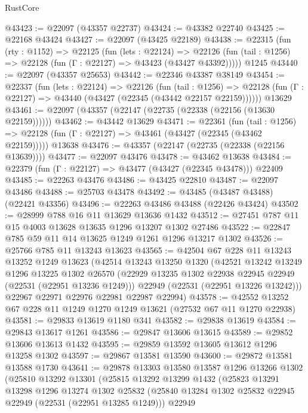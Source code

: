 \begin{lexlean}{RustCore}
\begin{coremodule}
@43423 := @22097 (@43357 @22737)
@43424 := @43382 @22740
@43425 := @22168 @43424
@43427 := @22097 (@43425 @22189)
@43438 := @22315
    (fun (rty : @1152) =>
    @22125
      (fun (lets : @22124) =>
      @22126 (fun (tail : @1256) => @22128 (fun (Γ : @22127) => @43423 (@43427 @43392)))))
    @1245
@43440 := @22097 (@43357 @25653)
@43442 := @22346 @43387 @38149
@43454 := @22337
    (fun (lets : @22124) =>
    @22126
      (fun (tail : @1256) =>
      @22128 (fun (Γ : @22127) => @43440 (@43427 (@22345 (@43442 @22157 @22159))))))
    @13629
@43461 := @22097 (@43357 (@22147 (@22735 (@22338 (@22156 (@13630 @22159))))))
@43462 := @43442 @13629
@43471 := @22361
    (fun (tail : @1256) => @22128 (fun (Γ : @22127) => @43461 (@43427 (@22345 (@43462 @22159)))))
    @13638
@43476 := @43357 (@22147 (@22735 (@22338 (@22156 @13639))))
@43477 := @22097 @43476
@43478 := @43462 @13638
@43484 := @22379 (fun (Γ : @22127) => @43477 (@43427 (@22345 @43478))) @22409
@43485 := @22263 @43476
@43486 := @43425 @22810
@43487 := @22097 @43486
@43488 := @25703 @43478
@43492 := @43485 (@43487 @43488) (@22421 @43356)
@43496 := @22263 @43486 @43488 (@22426 @43424)
@43502 := @28999 @788 @16 @11 @13629 @13636 @1432
@43512 := @27451 @787 @11 @15 @4003 @13628 @13635 @1296 @13207 @1302 @27486
@43522 := @22847 @785 @59 @11 @14 @13625 @1249 @1261 @1296 @13217 @1302
@43526 := @25766 @785 @11 @13243 @13623
@43565 := @42504
    @67
    @228
    @11
    @13243
    @13252
    @1249
    @13623
    (@42514
      @13243
      @13250
      @1320
      (@42521
        @13242
        @13249
        @1296
        @13225
        @1302
        @26570
        (@22929 @13235 @1302 @22938 @22945 @22949 (@22531 (@22951 @13236 @1249)))
        @22949
        (@22531 (@22951 @13226 @13242)))
      @22967
      @22971
      @22976
      @22981
      @22987
      @22994)
@43578 := @42552 @13252 @67 @228 @11 @1249 @1270 @1249 @13621 (@27532 @67 @11 @1270 @22938)
@43581 := @29833 @13619 @1180 @341
@43582 := @29838 @13619
@43584 := @29843 @13617 @1261
@43586 := @29847 @13606 @13615
@43589 := @29852 @13606 @13613 @1432
@43595 := @29859 @13592 @13605 @13612 @1296 @13258 @1302
@43597 := @29867 @13581 @13590
@43600 := @29872 @13581 @13588 @1730
@43641 := @29878
    @13303
    @13580
    @13587
    @1296
    @13266
    @1302
    (@25810
      @13292
      @13301
      (@25815
        @13292
        @13299
        @1432
        (@25823
          @13291
          @13298
          @1296
          @13274
          @1302
          @25832
          (@25840 @13284 @1302 @25832 @22945 @22949 (@22531 (@22951 @13285 @1249)))
          @22949

\end{coremodule}
\end{lexlean}
